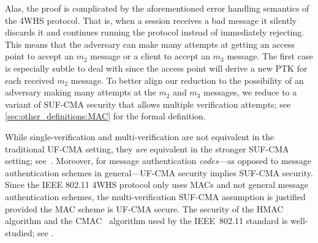 Alas,
the proof is complicated by the aforementioned error handling semantics of the 4WHS protocol.
That is,
when a session receives a bad message it silently discards it and continues running the protocol instead of immediately rejecting.
This means that the adversary can make many attempts at getting an access point to accept an $m_2$ message or a client to accept an $m_3$ message.
The first case is especially subtle to deal with since the access point will derive a new PTK for each received $m_2$ message.
To better align our reduction to the possibility of an adversary making many attempts at the $m_2$ and $m_3$ messages,
we reduce to a variant of SUF-CMA security that allows multiple verification attempts;
see \cref{sec:other_definitions:MAC} for the formal definition.

While single-verification and multi-verification are not equivalent in the traditional UF-CMA setting,
they \emph{are} equivalent in the stronger SUF-CMA setting;
see~\cite{EPRINT:BelGolMit04}.
Moreover,
for message authentication \emph{codes}---as opposed to message authentication schemes in general---UF-CMA 
security implies SUF-CMA security.
Since the IEEE 802.11 4WHS protocol only uses MACs and not general message authentication schemes,
the multi-verification SUF-CMA assumption is justified provided the MAC scheme is UF-CMA secure.
The security of the HMAC~\cite{IETF:RFC2104:HMAC} algorithm and the CMAC~\cite{FIPS:SP-800-38B:CMAC} 
algorithm used by the IEEE~802.11 standard is well-studied;
see \cite{C:GazPieRyb14,JC:Bellare15,FSE:IwaKur03,INDOCRYPT:IwaKur03}.




